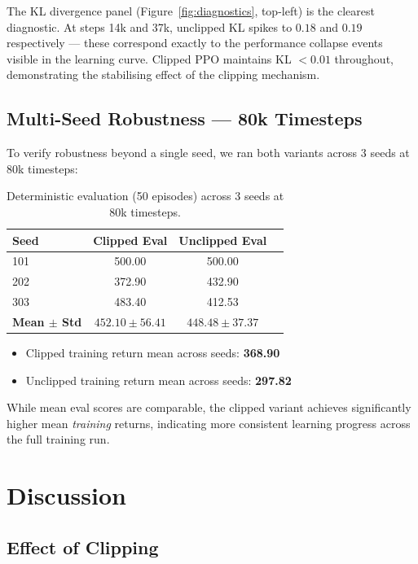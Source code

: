 \documentclass[12pt,a4paper]{article}
\begin{document}
The KL divergence panel (Figure~\ref{fig:diagnostics}, top-left) is the clearest diagnostic. At steps 14k and 37k, unclipped KL spikes to $0.18$ and $0.19$ respectively --- these correspond exactly to the performance collapse events visible in the learning curve. Clipped PPO maintains KL $< 0.01$ throughout, demonstrating the stabilising effect of the clipping mechanism.

\subsection{Multi-Seed Robustness --- 80k Timesteps}

To verify robustness beyond a single seed, we ran both variants across 3 seeds at 80k timesteps:

\begin{table}[H]
\centering
\caption{Deterministic evaluation (50 episodes) across 3 seeds at 80k timesteps.}
\begin{tabular}{lccc}
\toprule
\textbf{Seed} & \textbf{Clipped Eval} & \textbf{Unclipped Eval} \\
\midrule
101  & 500.00 & 500.00 \\
202  & 372.90 & 432.90 \\
303  & 483.40 & 412.53 \\
\midrule
\textbf{Mean $\pm$ Std} & $452.10 \pm 56.41$ & $448.48 \pm 37.37$ \\
\bottomrule
\end{tabular}
\end{table}

\begin{itemize}[noitemsep]
    \item Clipped training return mean across seeds: \textbf{368.90}
    \item Unclipped training return mean across seeds: \textbf{297.82}
\end{itemize}

While mean eval scores are comparable, the clipped variant achieves significantly higher mean \textit{training} returns, indicating more consistent learning progress across the full training run.

\section{Discussion}

\subsection{Effect of Clipping}
\end{document}
